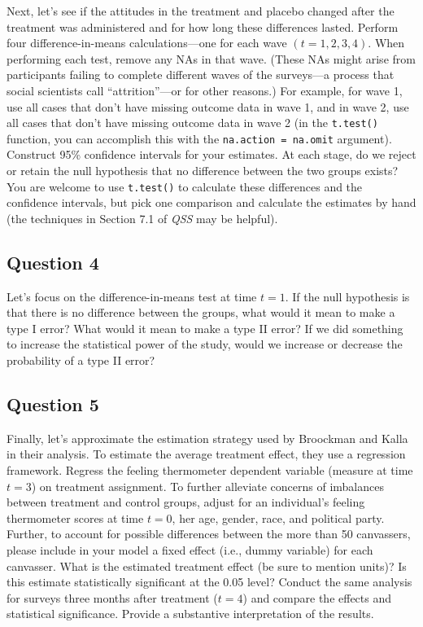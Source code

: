 \documentclass[]{article}
\begin{document}
Next, let's see if the attitudes in the treatment and placebo changed
after the treatment was administered and for how long these differences
lasted. Perform four difference-in-means calculations---one for each
wave $(t=1,2,3,4)$. When performing each test, remove any NAs in that
wave. (These NAs might arise from participants failing to complete
different waves of the surveys---a process that social scientists call
``attrition''---or for other reasons.) For example, for wave 1, use all
cases that don't have missing outcome data in wave 1, and in wave 2, use
all cases that don't have missing outcome data in wave 2 (in the
\texttt{t.test()} function, you can accomplish this with the
\texttt{na.action = na.omit} argument). Construct 95\% confidence
intervals for your estimates. At each stage, do we reject or retain the
null hypothesis that no difference between the two groups exists? You
are welcome to use \texttt{t.test()} to calculate these differences and
the confidence intervals, but pick one comparison and calculate the
estimates by hand (the techniques in Section 7.1 of \emph{QSS} may be
helpful).

\subsection{Question 4}\label{question-4}

Let's focus on the difference-in-means test at time $t=1$. If the null
hypothesis is that there is no difference between the groups, what would
it mean to make a type I error? What would it mean to make a type II
error? If we did something to increase the statistical power of the
study, would we increase or decrease the probability of a type II error?

\subsection{Question 5}\label{question-5}

Finally, let's approximate the estimation strategy used by Broockman and
Kalla in their analysis. To estimate the average treatment effect, they
use a regression framework. Regress the feeling thermometer dependent
variable (measure at time $t=3$) on treatment assignment. To further
alleviate concerns of imbalances between treatment and control groups,
adjust for an individual's feeling thermometer scores at time $t=0$, her
age, gender, race, and political party. Further, to account for possible
differences between the more than 50 canvassers, please include in your
model a fixed effect (i.e., dummy variable) for each canvasser. What is
the estimated treatment effect (be sure to mention units)? Is this
estimate statistically significant at the 0.05 level? Conduct the same
analysis for surveys three months after treatment ($t=4$) and compare
the effects and statistical significance. Provide a substantive
interpretation of the results.
\end{document}
